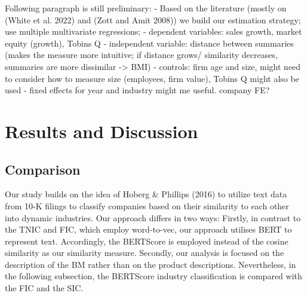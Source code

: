 \documentclass[
]{article}
\begin{document}
Following paragraph is still preliminary: - Based on the literature
(mostly on (White et al. 2022) and (Zott and Amit 2008)) we build our
estimation strategy; use multiple multivariate regressions; - dependent
variables: sales growth, market equity (growth), Tobins Q - independent
variable: distance between summaries (makes the measure more intuitive;
if distance grows/ similarity decreases, summaries are more dissimilar
-\textgreater{} BMI) - controls: firm age and size, might need to
consider how to measure size (employees, firm value), Tobins Q might
also be used - fixed effects for year and industry might me useful.
company FE?

\section{Results and Discussion}\label{results-and-discussion}

\subsection{Comparison}\label{comparison}

Our study builds on the idea of Hoberg \& Phillips (2016) to utilize
text data from 10-K filings to classify companies based on their
similarity to each other into dynamic industries. Our approach differs
in two ways: Firstly, in contrast to the TNIC and FIC, which employ
word-to-vec, our approach utilises BERT to represent text. Accordingly,
the BERTScore is employed instead of the cosine similarity as our
similarity measure. Secondly, our analysis is focused on the description
of the BM rather than on the product descriptions. Nevertheless, in the
following subsection, the BERTScore industry classification is compared
with the FIC and the SIC.
\end{document}
